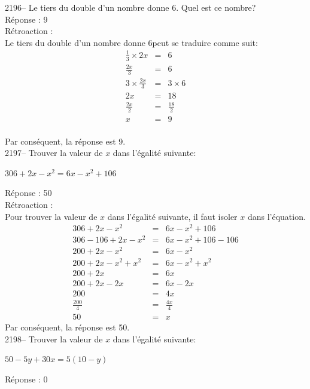 \documentclass[letterpaper, 12pt]{article}
\begin{document}
2196-- Le tiers du double d'un nombre donne 6. Quel est ce nombre?\\

R\'eponse : 9\\

R\'etroaction :\\
\og Le tiers du double d'un nombre donne 6\fg peut se traduire comme suit:
\begin{eqnarray*}
 \frac{1}{3}\times2x&=&6\\[2mm]
 \frac{2x}{3}&=&6\\[2mm]
 3\times\frac{2x}{3}&=&3\times6\\[2mm]
2x&=&18\\[2mm]
\frac{2x}{2}&=&\frac{18}{2}\\[2mm]
x&=&9
\end{eqnarray*}\\
Par cons\'equent, la r\'eponse est 9.\\

2197-- Trouver la valeur de $x$ dans l'\'egalit\'e suivante:
\begin{center}
 $306+2x-x^{2}=6x-x^{2}+106$
\end{center}

R\'eponse : 50\\

R\'etroaction :\\
Pour trouver la valeur de $x$ dans l'\'egalit\'e suivante, il faut isoler $x$ dans l'\'equation.
\begin{eqnarray*}
 306+2x-x^{2}&=&6x-x^{2}+106\\
 306-106+2x-x^{2}&=&6x-x^{2}+106-106\\
 200+2x-x^{2}&=&6x-x^{2}\\
 200+2x-x^{2}+x^{2}&=&6x-x^{2}+x^{2}\\
 200+2x&=&6x\\
 200+2x-2x&=&6x-2x\\
 200&=&4x\\[2mm]
 \frac{200}{4}&=&\frac{4x}{4}\\[2mm]
50&=&x
\end{eqnarray*}
Par cons\'equent, la r\'eponse est 50.\\

2198-- Trouver la valeur de $x$ dans l'\'egalit\'e suivante:
\begin{center}
 $50-5y+30x=5(10-y)$
\end{center}

R\'eponse : 0\\
\end{document}
